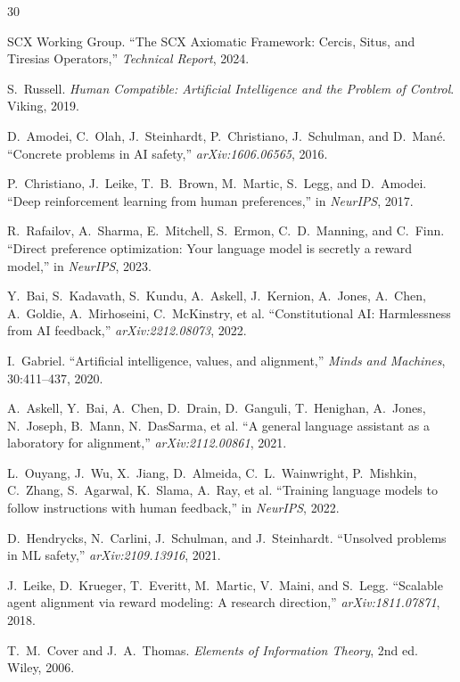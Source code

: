 \documentclass[12pt,a4paper]{article}
\begin{document}

\begin{thebibliography}{30}

SCX Working Group.
\newblock ``The SCX Axiomatic Framework: Cercis, Situs, and Tiresias
Operators,''
\newblock \emph{Technical Report}, 2024.

S.~Russell.
\newblock \emph{Human Compatible: Artificial Intelligence and the Problem of
Control}.
\newblock Viking, 2019.

D.~Amodei, C.~Olah, J.~Steinhardt, P.~Christiano, J.~Schulman, and D.~Man\'e.
\newblock ``Concrete problems in AI safety,''
\newblock \emph{arXiv:1606.06565}, 2016.

P.~Christiano, J.~Leike, T.~B.~Brown, M.~Martic, S.~Legg, and D.~Amodei.
\newblock ``Deep reinforcement learning from human preferences,''
\newblock in \emph{NeurIPS}, 2017.

R.~Rafailov, A.~Sharma, E.~Mitchell, S.~Ermon, C.~D.~Manning, and C.~Finn.
\newblock ``Direct preference optimization: Your language model is secretly a
reward model,''
\newblock in \emph{NeurIPS}, 2023.

Y.~Bai, S.~Kadavath, S.~Kundu, A.~Askell, J.~Kernion, A.~Jones, A.~Chen,
A.~Goldie, A.~Mirhoseini, C.~McKinstry, et al.
\newblock ``Constitutional AI: Harmlessness from AI feedback,''
\newblock \emph{arXiv:2212.08073}, 2022.

I.~Gabriel.
\newblock ``Artificial intelligence, values, and alignment,''
\newblock \emph{Minds and Machines}, 30:411--437, 2020.

A.~Askell, Y.~Bai, A.~Chen, D.~Drain, D.~Ganguli, T.~Henighan, A.~Jones,
N.~Joseph, B.~Mann, N.~DasSarma, et al.
\newblock ``A general language assistant as a laboratory for alignment,''
\newblock \emph{arXiv:2112.00861}, 2021.

L.~Ouyang, J.~Wu, X.~Jiang, D.~Almeida, C.~L.~Wainwright, P.~Mishkin,
C.~Zhang, S.~Agarwal, K.~Slama, A.~Ray, et al.
\newblock ``Training language models to follow instructions with human
feedback,''
\newblock in \emph{NeurIPS}, 2022.

D.~Hendrycks, N.~Carlini, J.~Schulman, and J.~Steinhardt.
\newblock ``Unsolved problems in ML safety,''
\newblock \emph{arXiv:2109.13916}, 2021.

J.~Leike, D.~Krueger, T.~Everitt, M.~Martic, V.~Maini, and S.~Legg.
\newblock ``Scalable agent alignment via reward modeling: A research
direction,''
\newblock \emph{arXiv:1811.07871}, 2018.

T.~M.~Cover and J.~A.~Thomas.
\newblock \emph{Elements of Information Theory}, 2nd ed.
\newblock Wiley, 2006.

\end{thebibliography}
\end{document}
